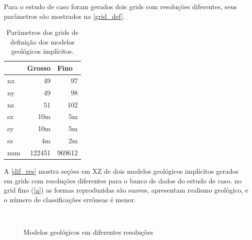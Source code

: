 Para o estudo de caso foram gerados dois grids com resoluções diferentes, seus parâmetros são mostrados na \autoref{grid_def}.

\begin{table}[]
\centering
\begin{tabular}{lrr}
 & \multicolumn{1}{l}{Grosso} & \multicolumn{1}{l}{Fino} \\ \hline
nx & 49 & 97 \\
ny & 49 & 98 \\
nz & 51 & 102 \\
sx & 10m & 5m \\
sy & 10m & 5m \\
sz & 4m & 2m \\
num & 122451 & 969612 \\ \hline
\end{tabular}
\caption{Parâmetros dos grids de definição dos modelos geológicos implícitos.} \label{grid_def}
\end{table}

A \autoref{dif_res} mostra seções em XZ de dois modelos geológicos implícitos gerados em grids com resoluções diferentes para o banco de dados do estudo de caso. no grid fino (\autoref{a}) as formas reproduzidas são suaves, apresentam realismo geológico, e o número de classificações errôneas é menor.

\begin{figure}[t]
\caption{Modelos geológicos em diferentes resoluções} 
\label{dif_res}
\begin{center}
\\
\end{center}
\begin{center}
\end{center}
\end{figure}

